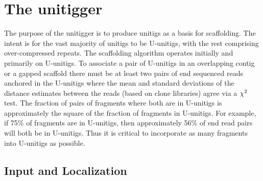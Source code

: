 \documentclass{article}
\begin{document}
\section{The unitigger}
The purpose of the unitigger is to produce unitigs as a basis for
scaffolding. The intent is for the vast majority of unitigs to be
U-unitigs, with the rest comprising over-compressed repeats. The
scaffolding algorithm operates initially and primarily on
U-unitigs. To associate a pair of U-unitigs in an overlapping contig
or a gapped scaffold there must be at least two pairs of end sequenced
reads anchored in the U-unitigs where the mean and standard deviations
of the distance estimates between the reads (based on clone libraries)
agree via a $\mathnormal{\chi}^2$ test. The fraction of pairs of
fragments where both are in U-unitigs is approximately the square of
the fraction of fragments in U-unitigs. For example, if 75\% of
fragments are in U-unitigs, then approximately 56\% of end read pairs
will both be in U-unitigs. Thus it is critical to incorporate as many
fragments into U-unitigs as possible.


\subsection{Input and Localization}






\end{document}

